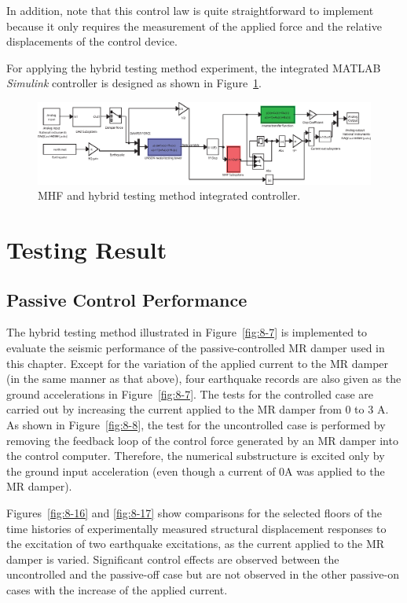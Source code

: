 In addition, note that this control law is quite straightforward to implement because it only requires the measurement of the applied force and the relative displacements of the control device.

For applying the hybrid testing method experiment, the integrated MATLAB \textit{Simulink} controller is designed as shown in Figure~\ref{fig:8-15}.

\begin{figure}[H]
\centering
\includegraphics[width=1\textwidth] {figure/8-15.eps}
\caption{MHF and hybrid testing method integrated controller.}
\label{fig:8-15}
\end{figure}

\section{Testing Result}
\subsection{Passive Control Performance}

The hybrid testing method illustrated in Figure~\ref{fig:8-7} is implemented to evaluate the seismic performance of the passive-controlled MR damper used in this chapter. Except for the variation of the applied current to the MR damper (in the same manner as that above), four earthquake records are also given as the ground accelerations in Figure~\ref{fig:8-7}. The tests for the controlled case are carried out by increasing the current applied to the MR damper from 0 to 3 A. As shown in Figure~\ref{fig:8-8}, the test for the uncontrolled case is performed by removing the feedback loop of the control force generated by an MR damper into the control computer. Therefore, the numerical substructure is excited only by the ground input acceleration (even though a current of 0A was applied to the MR damper).

Figures~\ref{fig:8-16} and \ref{fig:8-17} show comparisons for the selected floors of the time histories of experimentally measured structural displacement responses to the excitation of two earthquake excitations, as the current applied to the MR damper is varied. Significant control effects are observed between the uncontrolled and the passive-off case but are not observed in the other passive-on cases with the increase of the applied current.

